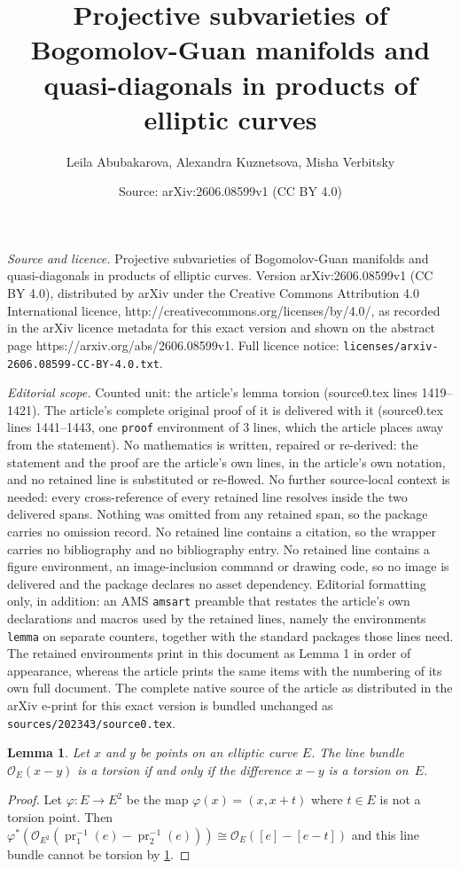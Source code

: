 \documentclass[10pt,a4paper]{amsart}
\title{Projective subvarieties of Bogomolov-Guan manifolds and quasi-diagonals in products of elliptic curves}
\author{Leila Abubakarova, Alexandra Kuznetsova, Misha Verbitsky}
\date{Source: arXiv:2606.08599v1 (CC BY 4.0)}
\newtheorem{lemma}{Lemma}
\newcommand{\OP}{\mathcal{O}}
\DeclareMathOperator{\pr}{pr}
\begin{document}
\maketitle

\noindent\emph{Source and licence.} Projective subvarieties of Bogomolov-Guan manifolds and quasi-diagonals in products of elliptic curves. Version arXiv:2606.08599v1 (CC BY 4.0), distributed by arXiv under the Creative Commons Attribution 4.0 International licence, http://creativecommons.org/licenses/by/4.0/, as recorded in the arXiv licence metadata for this exact version and shown on the abstract page https://arxiv.org/abs/2606.08599v1. Full licence notice: \texttt{licenses/arxiv-2606.08599-CC-BY-4.0.txt}.\par\smallskip

\noindent\textit{Editorial scope.} Counted unit: the article's lemma torsion (source0.tex lines 1419--1421). The article's complete original proof of it is delivered with it (source0.tex lines 1441--1443, one \texttt{proof} environment of 3 lines, which the article places away from the statement). No mathematics is written, repaired or re-derived: the statement and the proof are the article's own lines, in the article's own notation, and no retained line is substituted or re-flowed.  No further source-local context is needed: every cross-reference of every retained line resolves inside the two delivered spans.  Nothing was omitted from any retained span, so the package carries no omission record.  No retained line contains a citation, so the wrapper carries no bibliography and no bibliography entry.  No retained line contains a figure environment, an image-inclusion command or drawing code, so no image is delivered and the package declares no asset dependency.  Editorial formatting only, in addition: an AMS \texttt{amsart} preamble that restates the article's own declarations and macros used by the retained lines, namely the environments \texttt{lemma} on separate counters, together with the standard packages those lines need.  The retained environments print in this document as Lemma 1 in order of appearance, whereas the article prints the same items with the numbering of its own full document.  The complete native source of the article as distributed in the arXiv e-print for this exact version is bundled unchanged as \texttt{sources/202343/source0.tex}.
  \begin{lemma}\label{lemma: x-y is torsion equivalently the line bundle is torsion}
  Let $x$ and $y$ be points on an elliptic curve $E$. The line bundle~$\OP_E(x-y)$ is a torsion if and only if the difference $x-y$ is a torsion on~$E$.
 \end{lemma}

 \begin{proof}
   Let $\varphi\colon E\to E^2$ be the map $\varphi(x) = (x,x+t)$ where $t\in E$ is not a torsion point. Then $\varphi^*(\OP_{E^2}(\pr_1^{-1}(e) - \pr_2^{-1}(e)))\cong \OP_E([e] - [e-t])$ and this line bundle cannot be torsion by \ref{lemma: x-y is torsion equivalently the line bundle is torsion}.
 \end{proof}
\end{document}
